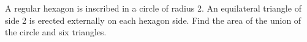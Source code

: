 A regular hexagon is inscribed in a circle of radius 2. An equilateral triangle of side 2 is erected externally on each hexagon side. Find the area of the union of the circle and six triangles.
